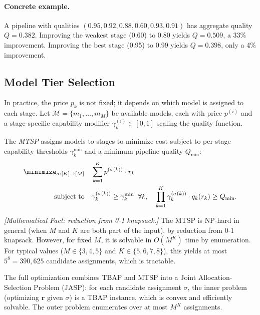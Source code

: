 \paragraph{Concrete example.} A pipeline with qualities $(0.95, 0.92, 0.88, 0.60, 0.93, 0.91)$ has aggregate quality $Q = 0.382$. Improving the weakest stage (0.60) to 0.80 yields $Q = 0.509$, a 33\% improvement. Improving the best stage (0.95) to 0.99 yields $Q = 0.398$, only a 4\% improvement.

\subsection{Model Tier Selection}

In practice, the price $p_k$ is not fixed; it depends on which model is assigned to each stage. Let $\mathcal{M} = \{m_1, \ldots, m_M\}$ be available models, each with price $p^{(i)}$ and a stage-specific capability modifier $\gamma_k^{(i)} \in [0,1]$ scaling the quality function.

\begin{definition}
\label{def:econ-mtsp}
The \emph{MTSP} assigns models to stages to minimize cost subject to per-stage capability thresholds $\gamma_k^{\min}$ and a minimum pipeline quality $Q_{\min}$:
\begin{equation}\label{eq:econ-mtsp}
\begin{aligned}
    \minimize_{\sigma: [K] \to [M]} \quad & \sum_{k=1}^{K} p^{(\sigma(k))} \cdot r_k \\
    \text{subject to} \quad & \gamma_k^{(\sigma(k))} \geq \gamma_k^{\min} \;\; \forall k, \quad \prod_{k=1}^{K} \gamma_k^{(\sigma(k))} \cdot q_k(r_k) \geq Q_{\min}.
\end{aligned}
\end{equation}
\end{definition}

\begin{proposition}[Complexity]
\label{prop:econ-complexity}
\emph{[Mathematical Fact: reduction from 0-1 knapsack.]}
The MTSP is NP-hard in general (when $M$ and $K$ are both part of the input), by reduction from 0-1 knapsack. However, for fixed $M$, it is solvable in $O(M^K)$ time by enumeration. For typical values ($M \in \{3, 4, 5\}$ and $K \in \{5, 6, 7, 8\}$), this yields at most $5^8 = 390{,}625$ candidate assignments, which is tractable.
\end{proposition}

The full optimization combines TBAP and MTSP into a Joint Allocation-Selection Problem (JASP): for each candidate assignment $\sigma$, the inner problem (optimizing $\mathbf{r}$ given $\sigma$) is a TBAP instance, which is convex and efficiently solvable. The outer problem enumerates over at most $M^K$ assignments.


